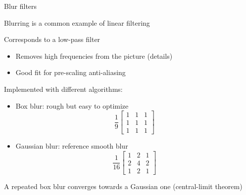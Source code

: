 \begin{frame}{Blur filters}
  \begin{itemize}
  \item Blurring is a common example of linear filtering
  \item Corresponds to a low-pass filter
    \begin{itemize}
    \item Removes high frequencies from the picture (details)
    \item Good fit for pre-scaling anti-aliasing
    \end{itemize}
\begin{minipage}[b]{0.45\textwidth}
  \item Implemented with different algorithms:
    \vspace{-1.5em}
    \begin{itemize}
    \item Box blur: rough but easy to optimize
\[
\frac{1}{9}
\left[
\begin{matrix}
1 & 1 & 1 \\
1 & 1 & 1 \\
1 & 1 & 1
\end{matrix}
\right]
\]
    \end{itemize}
\end{minipage}
\begin{minipage}[b]{0.45\textwidth}
    \begin{itemize}
    \item Gaussian blur: reference smooth blur
\[
\frac{1}{16}
\left[
\begin{matrix}
1 & 2 & 1 \\
2 & 4 & 2 \\
1 & 2 & 1
\end{matrix}
\right]
\]
    \end{itemize}
    \end{minipage}
  \item A repeated box blur converges towards a Gaussian one (central-limit theorem)
  \end{itemize}
\end{frame}

